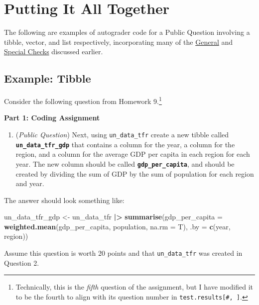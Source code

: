 \documentclass[
  12pt,
]{book}
\newenvironment{Shaded}{\begin{snugshade}}{\end{snugshade}}
\newcommand{\AttributeTok}[1]{\textcolor[rgb]{0.13,0.29,0.53}{#1}}
\newcommand{\FunctionTok}[1]{\textcolor[rgb]{0.13,0.29,0.53}{\textbf{#1}}}
\newcommand{\NormalTok}[1]{#1}
\newcommand{\OtherTok}[1]{\textcolor[rgb]{0.56,0.35,0.01}{#1}}
\newcommand{\SpecialCharTok}[1]{\textcolor[rgb]{0.81,0.36,0.00}{\textbf{#1}}}
\providecommand{\tightlist}{%
  \setlength{\itemsep}{0pt}\setlength{\parskip}{0pt}}
\begin{document}
\chapter{Putting It All Together}\label{Putting-It-All-Together}

The following are examples of autograder code for a Public Question involving a tibble, vector, and list respectively, incorporating many of the \hyperref[General-Checks]{General} and \hyperref[Special-Checks]{Special Checks} discussed earlier.

\section{Example: Tibble}\label{example-tibble}

Consider the following question from Homework 9.\footnote{Technically, this is the \emph{fifth} question of the assignment, but I have modified it to be the fourth to align with its question number in \texttt{test.results{[}\#,\ {]}}.}

\textbf{Part 1: Coding Assignment}

\begin{enumerate}
\def\labelenumi{\arabic{enumi}.}
\setcounter{enumi}{3}
\tightlist
\item
  (\emph{Public Question}) Next, using \texttt{un\_data\_tfr} create a new tibble called \textbf{\texttt{un\_data\_tfr\_gdp}} that contains a column for the year, a column for the region, and a column for the average GDP per capita in each region for each year. The new column should be called \textbf{\texttt{gdp\_per\_capita}}, and should be created by dividing the sum of GDP by the sum of population for each region and year.
\end{enumerate}

The answer should look something like:

\begin{Shaded}
\begin{Highlighting}[]
\NormalTok{un\_data\_tfr\_gdp }\OtherTok{\textless{}{-}}\NormalTok{ un\_data\_tfr }\SpecialCharTok{|\textgreater{}}
  \FunctionTok{summarise}\NormalTok{(}\AttributeTok{gdp\_per\_capita =} \FunctionTok{weighted.mean}\NormalTok{(gdp\_per\_capita, population, }\AttributeTok{na.rm =}\NormalTok{ T),}
            \AttributeTok{.by =} \FunctionTok{c}\NormalTok{(year, region))}
\end{Highlighting}
\end{Shaded}

Assume this question is worth 20 points and that \texttt{un\_data\_tfr} was created in Question 2.
\end{document}
